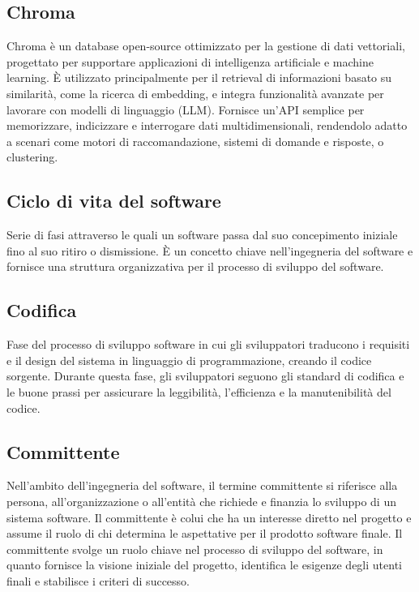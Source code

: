\hypertarget{sec:chroma}{}
\subsection*{Chroma}
Chroma è un database open-source ottimizzato per la gestione di dati vettoriali, progettato per supportare applicazioni di intelligenza artificiale e 
machine learning. È utilizzato principalmente per il retrieval di informazioni basato su similarità, come la ricerca di embedding, e integra funzionalità 
avanzate per lavorare con modelli di linguaggio (LLM). Fornisce un'API semplice per memorizzare, indicizzare e interrogare dati multidimensionali, 
rendendolo adatto a scenari come motori di raccomandazione, sistemi di domande e risposte, o clustering.

\hypertarget{sec:ciclo_di_vita}{}
\subsection*{Ciclo di vita del software}
Serie di fasi attraverso le quali un software passa dal suo concepimento iniziale fino al suo ritiro o dismissione. È un concetto chiave nell'ingegneria 
del software e fornisce una struttura organizzativa per il processo di sviluppo del software.

\hypertarget{sec:codifica}{}
\subsection*{Codifica}
Fase del processo di sviluppo software in cui gli sviluppatori traducono i requisiti e il design del sistema in linguaggio di programmazione, creando il 
codice sorgente. Durante questa fase, gli sviluppatori seguono gli standard di codifica e le buone prassi per assicurare la leggibilità, l’efficienza e la 
manutenibilità del codice.

\hypertarget{sec:committente}{}
\subsection*{Committente}
Nell’ambito dell’ingegneria del software, il termine committente si riferisce alla persona, all’organizzazione o all’entità che richiede e 
finanzia lo sviluppo di un sistema software. Il committente è colui che ha un interesse diretto nel progetto e assume il ruolo
di chi determina le aspettative per il prodotto software finale. Il committente svolge un ruolo chiave nel processo di sviluppo del software, 
in quanto fornisce la visione iniziale del progetto, identifica le esigenze degli utenti finali e stabilisce i criteri di successo.

